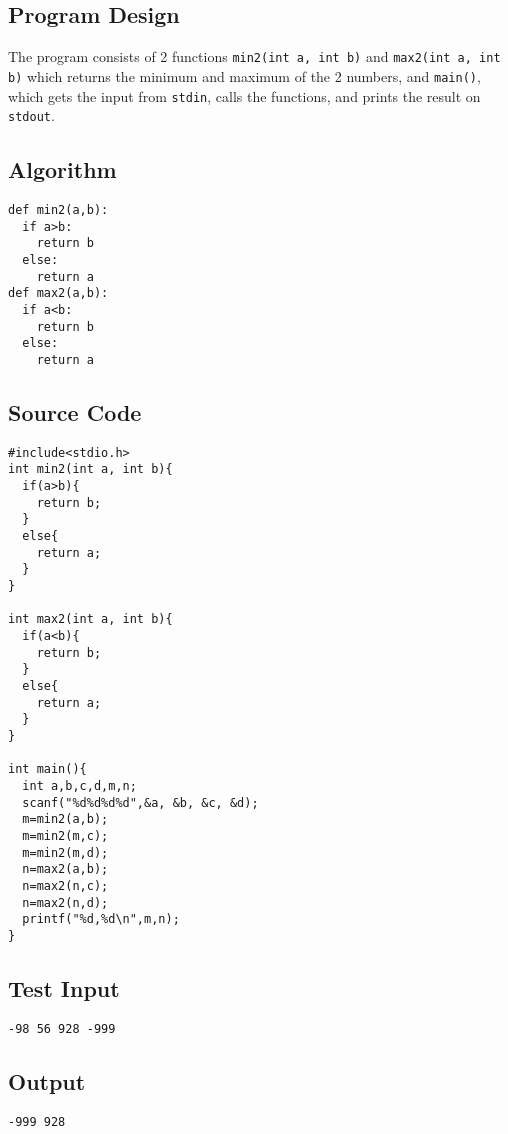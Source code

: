 \documentclass[11pt]{article}
\begin{document}
\subsection*{Program Design}
\label{sec-4-3}
The program consists of 2 functions \texttt{min2(int a, int b)} and \texttt{max2(int a, int b)}
which returns the minimum and maximum of the 2 numbers, and \texttt{main()}, which
gets the input from \texttt{stdin}, calls the functions, and prints the result on \texttt{stdout}.
\subsection*{Algorithm}
\label{sec-4-4}
\begin{verbatim}
def min2(a,b):
  if a>b:
    return b
  else:
    return a
def max2(a,b):
  if a<b:
    return b
  else:
    return a
\end{verbatim}
\subsection*{Source Code}
\label{sec-4-5}

\begin{verbatim}
#include<stdio.h>
int min2(int a, int b){
  if(a>b){
    return b;
  }
  else{
    return a;
  }
}

int max2(int a, int b){
  if(a<b){
    return b;
  }
  else{
    return a;
  }
}

int main(){
  int a,b,c,d,m,n;
  scanf("%d%d%d%d",&a, &b, &c, &d);
  m=min2(a,b);
  m=min2(m,c);
  m=min2(m,d);
  n=max2(a,b);
  n=max2(n,c);
  n=max2(n,d);
  printf("%d,%d\n",m,n);
}
\end{verbatim}

\subsection*{Test Input}
\label{sec-4-6}
\begin{verbatim}
-98 56 928 -999
\end{verbatim}
\subsection*{Output}
\label{sec-4-7}
\begin{verbatim}
-999 928
\end{verbatim}
\end{document}
